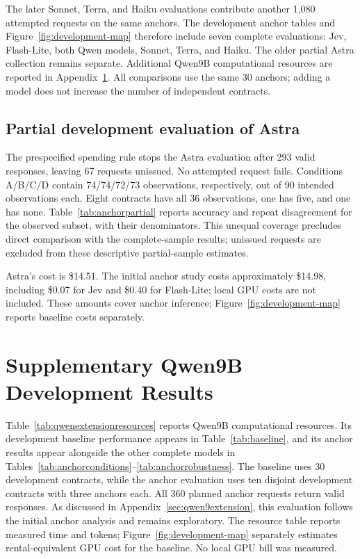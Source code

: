 \documentclass{article}
\begin{document}
The later Sonnet, Terra, and Haiku evaluations contribute another 1,080 attempted requests on the same anchors. The development anchor tables and Figure~\ref{fig:development-map} therefore include seven complete evaluations: Jev, Flash-Lite, both Qwen models, Sonnet, Terra, and Haiku. The older partial Astra collection remains separate. Additional Qwen9B computational resources are reported in Appendix~\ref{app:extension}. All comparisons use the same 30 anchors; adding a model does not increase the number of independent contracts.

\subsection{Partial development evaluation of Astra}
\label{app:astra}
The prespecified spending rule stops the Astra evaluation after 293 valid responses, leaving 67 requests unissued. No attempted request fails. Conditions A/B/C/D contain 74/74/72/73 observations, respectively, out of 90 intended observations each. Eight contracts have all 36 observations, one has five, and one has none. Table~\ref{tab:anchorpartial} reports accuracy and repeat disagreement for the observed subset, with their denominators. This unequal coverage precludes direct comparison with the complete-sample results; unissued requests are excluded from these descriptive partial-sample estimates.

Astra's cost is \$14.51. The initial anchor study costs approximately \$14.98, including \$0.07 for Jev and \$0.40 for Flash-Lite; local GPU costs are not included. These amounts cover anchor inference; Figure~\ref{fig:development-map} reports baseline costs separately.



\section{Supplementary Qwen9B Development Results}
\label{app:extension}
Table~\ref{tab:qwenextensionresources} reports Qwen9B computational resources. Its development baseline performance appears in Table~\ref{tab:baseline}, and its anchor results appear alongside the other complete models in Tables~\ref{tab:anchorconditions}--\ref{tab:anchorrobustness}. The baseline uses 30 development contracts, while the anchor evaluation uses ten disjoint development contracts with three anchors each. All 360 planned anchor requests return valid responses. As discussed in Appendix~\ref{sec:qwen9extension}, this evaluation follows the initial anchor analysis and remains exploratory. The resource table reports measured time and tokens; Figure~\ref{fig:development-map} separately estimates rental-equivalent GPU cost for the baseline. No local GPU bill was measured.

\end{document}
